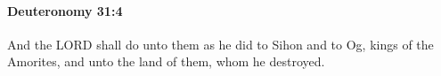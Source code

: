 
		\paragraph{Deuteronomy 31:4} %
			\label{DEUTERONOMY-31-4}

			And the LORD shall do unto them as he did to Sihon and to Og, kings of the Amorites, and unto the land of them, whom he destroyed.


